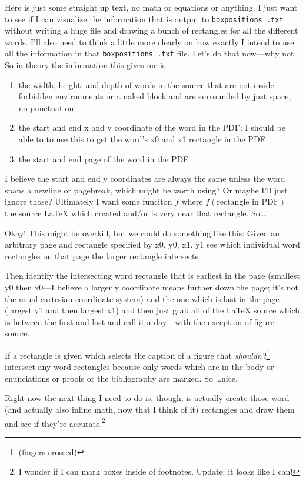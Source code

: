 \documentclass{amsart}
\begin{document}
Here is just some straight up text, no math or equations or anything. I just want to see if I can visualize the information that is output to \texttt{boxpositions\_.txt} without writing a huge file and drawing a bunch of rectangles for all the different words. I'll also need to think a little more clearly on how exactly I intend to use all the information in that {\tt boxpositions\_.txt} file. Let's do that now---why not. So in theory the information this gives me is
\begin{enumerate}
\item the width, height, and depth of words in the source that are not inside forbidden environments or a naked block and are surrounded by just space, no punctuation.
\item the start and end x and y coordinate of the word in the PDF: I should be able to to use this to get the word's x0 and x1 rectangle in the PDF
\item the start and end page of the word in the PDF
\end{enumerate}
I believe the start and end y coordinates are always the same unless the word spans a newline or pagebreak, which might be worth using? Or maybe I'll just ignore those? Ultimately I want some funciton $f$ where $f(\text{rectangle in PDF}) = $ the source \LaTeX{} which created and/or is very near that rectangle. So\dots.

Okay! This might be overkill, but we could do something like this:
Given an arbitrary page and rectangle specified by x0, y0, x1, y1 see which individual word rectangles on that page the larger rectangle intersects.

Then identify the intersecting word rectangle that is earliest in the page (smallest y0 then x0---I believe a larger y coordinate means further down the page; it's not the usual cartesian coordinate system) and the one which is last in the page (largest y1 and then largest x1) and then just grab all of the \LaTeX{} source which is between the first and last and call it a day---with the exception of figure source.

If a rectangle is given which selects the caption of a figure that \textit{shouldn't}\footnote{(fingers crossed)} intersect any word rectangles because only words which are in the body or enunciations or proofs or the bibliography are marked. So \dots nice.

Right now the next thing I need to do is, though, is actually create those word (and actually also inline math, now that I think of it) rectangles and draw them and see if they're accurate.\footnote[9001]{I wonder if I can mark boxes inside of footnotes. Update: it looks like I can!}
\end{document}
